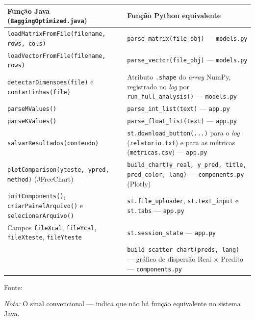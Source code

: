 \begin{quadro}[ht]
\begin{center}
\footnotesize
\captionsetup{justification=centering, labelsep=endash, width=0.75\linewidth}
\caption{Equivalência entre as funções de interface e de entrada e saída: Java e Python.}
\label{tab:equiv_interface}
\begin{threeparttable}
\renewcommand{\arraystretch}{1.15}
\begin{tabularx}{\textwidth}{|>{\raggedright\arraybackslash}X|>{\raggedright\arraybackslash}X|}
\hline
\textbf{Função Java (\texttt{BaggingOptimized.java})} & \textbf{Função Python equivalente} \\ \hline
\texttt{loadMatrixFromFile(filename, rows, cols)} & \texttt{parse\_matrix(file\_obj)} --- \texttt{models.py} \\ \hline
\texttt{loadVectorFromFile(filename, rows)} & \texttt{parse\_vector(file\_obj)} --- \texttt{models.py} \\ \hline
\texttt{detectarDimensoes(file)} e \texttt{contarLinhas(file)} & Atributo \texttt{.shape} do \textit{array} NumPy, registrado no \textit{log} por \texttt{run\_full\_analysis()} --- \texttt{models.py} \\ \hline
\texttt{parseMValues()} & \texttt{parse\_int\_list(text)} --- \texttt{app.py} \\ \hline
\texttt{parseKValues()} & \texttt{parse\_float\_list(text)} --- \texttt{app.py} \\ \hline
\texttt{salvarResultados(conteudo)} & \texttt{st.download\_button(...)} para o \textit{log} (\texttt{relatorio.txt}) e para as métricas (\texttt{metricas.csv}) --- \texttt{app.py} \\ \hline
\texttt{plotComparison(yteste, ypred, method)} (JFreeChart) & \texttt{build\_chart(y\_real, y\_pred, title, pred\_color, lang)} --- \texttt{components.py} (Plotly) \\ \hline
\texttt{initComponents()}, \texttt{criarPainelArquivo()} e \texttt{selecionarArquivo()} & \texttt{st.file\_uploader}, \texttt{st.text\_input} e \texttt{st.tabs} --- \texttt{app.py} \\ \hline
Campos \texttt{fileXcal}, \texttt{fileYcal}, \texttt{fileXteste}, \texttt{fileYteste} & \texttt{st.session\_state} --- \texttt{app.py} \\ \hline
\multicolumn{1}{|c|}{---} & \texttt{build\_scatter\_chart(preds, lang)} --- gráfico de dispersão Real $\times$ Predito --- \texttt{components.py} \\ \hline
\end{tabularx}
\begin{tablenotes}[flushleft]
\footnotesize
\item Fonte:~\oautor
\item \textit{Nota:} O sinal convencional --- indica que não há função equivalente no sistema Java.
\end{tablenotes}
\end{threeparttable}
\end{center}
\end{quadro}
